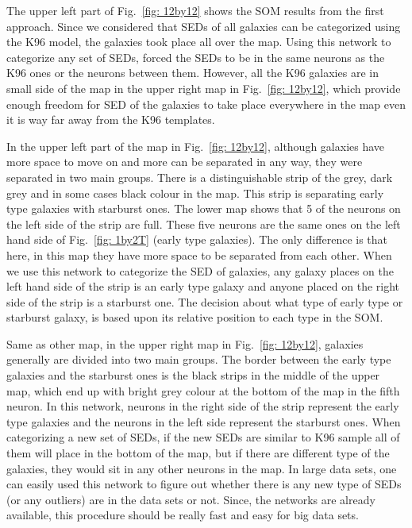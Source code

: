     The upper left part of Fig.~\ref{fig: 12by12} shows the SOM results from the first approach. 
    Since we considered that SEDs of all galaxies can be categorized using the K96 model, the galaxies took place all over the map.
    Using this network to categorize any set of SEDs, forced the SEDs to be in the same neurons as the K96 ones or the neurons between them.
    However, all the K96 galaxies are in small side of the map in the upper right map in Fig.~\ref{fig: 12by12}, which provide enough freedom for SED of the galaxies to take place everywhere in the map even it is way far away from the K96 templates.
    
    
    In the upper left part of the map in Fig.~\ref{fig: 12by12}, although galaxies have more space to move on and more can be separated in any way, they were separated in two main groups.
    There is a distinguishable strip of the grey, dark grey and in some cases black colour in the map.
    This strip is separating early type galaxies with starburst ones.
    The lower map shows that 5 of the neurons on the left side of the strip are full. 
    These five neurons are the same ones on the left hand side of Fig.~\ref{fig: 1by2T} (early type galaxies).
    The only difference is that here, in this map they have more space to be separated from each other.
    When we use this network to categorize the SED of galaxies, any galaxy places on the left hand side of the strip is an early type galaxy and anyone placed on the right side of the strip is a starburst one.
    The decision about what type of early type or starburst galaxy, is based upon its relative position to each type in the SOM.
    
    Same as other map, in the upper right map in Fig.~\ref{fig: 12by12}, galaxies generally are divided into two main groups.
    The border between the early type galaxies and the starburst ones is the black strips in the middle of the upper map, which end up with bright grey colour at the bottom of the map in the fifth neuron.
    In this network, neurons in the right side of the strip represent the early type galaxies and the neurons in the left side represent the starburst ones. 
    When categorizing a new set of SEDs, if the new SEDs are similar to K96 sample all of them will place in the bottom of the map, but if there are different type of the galaxies, they would sit in any other neurons in the map.
    In large data sets, one can easily used this network to figure out whether there is any new type of SEDs (or any outliers) are in the data sets or not. 
    Since, the networks are already available, this procedure should be really fast and easy for big data sets.
    
